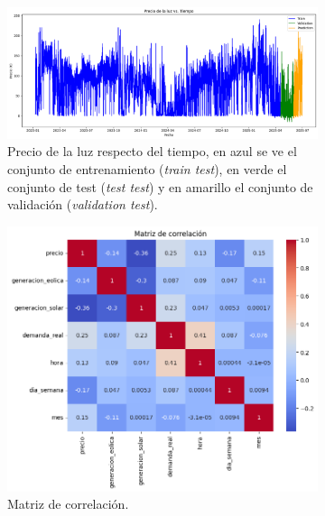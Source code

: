 \begin{figure}[H]
\centering
\begin{subfigure}[b]{0.7\textwidth}
\centering
\includegraphics[width=\textwidth]{figuras/historico_precios.png}
\caption[Precio de la luz respecto del tiempo]{Precio de la luz respecto del tiempo, en azul se ve el conjunto de entrenamiento (\textit{train test}), en verde el conjunto de test (\textit{test test}) y en amarillo el conjunto de validación (\textit{validation test}).}
\label{Precio vs tiempo}
\end{subfigure}
\begin{subfigure}[b]{0.6\textwidth}
\centering
\includegraphics[width=\textwidth]{figuras/matriz_correlacion.png}
\caption[Matriz de correlación]{Matriz de correlación.}
\label{Matriz de correlacion}
\end{subfigure}
\begin{subfigure}[b]{0.4\textwidth}
\centering

\end{subfigure}
\end{figure}
